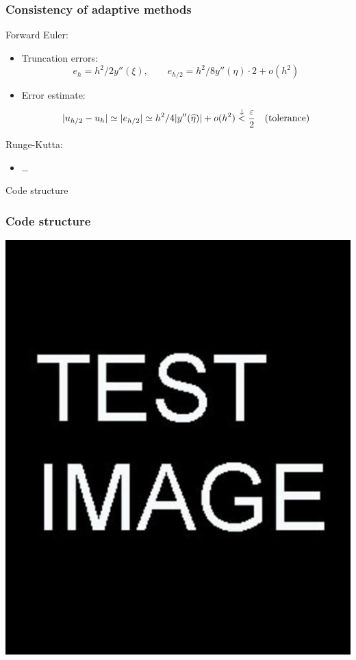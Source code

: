 \documentclass{beamer}
\begin{document}
\begin{frame} %
	\frametitle{Consistency of adaptive methods}
	Forward Euler:
	\begin{itemize}
		\item Truncation errors:
		$$ e_h = h^2/2 y''(\xi), \qquad e_{h/2} = h^2/8 y''(\eta) \cdot 2 + o(h^2) $$
		\item Error estimate:
		$$ \lvert u_{h/2} - u_h\rvert \simeq \lvert e_{h/2}\rvert \simeq h^2/4 \lvert y''(\widehat\eta)\rvert
		+ o(h^2) \stackrel{\downarrow}{<} \frac{\varepsilon}{2}
		\quad \text{(tolerance)} $$
	\end{itemize}
	\pause
	Runge-Kutta:
	\begin{itemize}
		\item \dots %
	\end{itemize}
\end{frame}


\begin{frame}[c] %
\begin{center}
	\Huge \color{blue} Code structure
\end{center}
\end{frame}


\begin{frame} %
	\frametitle{Code structure}
	\includegraphics[scale=0.2]{etc/test.jpg}
\end{frame}
\end{document}
